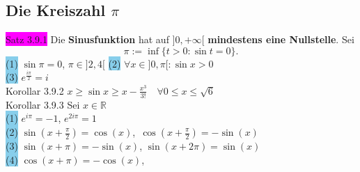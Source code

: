 \documentclass[landscape, 10pt]{article}
\newcommand{\R}{\mathbb{R}}
\begin{document}
\begin{multicols}{3}
       \subsection{Die Kreiszahl $\pi$}
              \colorbox{magenta}{Satz 3.9.1} 
                     Die \textbf{Sinusfunktion} hat auf 
                     \textcolor{NavyBlue}{$]0,+\infty[$}
                     \textbf{mindestens eine Nullstelle}. Sei 
                     \begin{equation*}
                            \pi:=\inf\{t>0:\sin t=0\}.
                     \end{equation*}
                     \colorbox{SkyBlue}{(1)} 
                            \textcolor{NavyBlue}{$\sin\pi=0$},\enspace
                            \textcolor{NavyBlue}{$\pi\in]2,4[$} \quad
                     \colorbox{SkyBlue}{(2)} 
                            \textcolor{NavyBlue}{
                            $\forall x\in]0,\pi[:\sin x>0$}\\
                     \colorbox{SkyBlue}{(3)} 
                            \textcolor{NavyBlue}{
                            $e^{\frac{i\pi}{2}}=i$}\\
              \colorbox{BurntOrange}{Korollar 3.9.2} 
                     \textcolor{NavyBlue}{
                     $x\geqslant\sin x\geqslant 
                     x-\frac{x^3}{3!}\quad
                     \forall0\leqslant x\leqslant\sqrt{6}$}\\
              \colorbox{BurntOrange}{Korollar 3.9.3}
                     Sei \textcolor{NavyBlue}{$x\in\R$}\\
                     \colorbox{SkyBlue}{(1)} 
                            \textcolor{NavyBlue}{$e^{i\pi}=-1$}, \qquad
                            \textcolor{NavyBlue}{$e^{2i\pi}=1$}\\ 
                     \colorbox{SkyBlue}{(2)} 
                            \textcolor{NavyBlue}{
                            $\sin(x+\frac{\pi}{2})=\cos(x)$},\,
                            \textcolor{NavyBlue}{
                            $\cos(x+\frac{\pi}{2})=-\sin(x)$}\\ 
                     \colorbox{SkyBlue}{(3)} 
                            \textcolor{NavyBlue}{
                            $\sin(x+\pi)=-\sin(x)$},
                            \textcolor{NavyBlue}{
                            $\sin(x+2\pi)=\sin(x)$}\\
                     \colorbox{SkyBlue}{(4)}
                            \textcolor{NavyBlue}{
                            $\cos(x+\pi)=-\cos(x)$},

\end{multicols}
\end{document}
